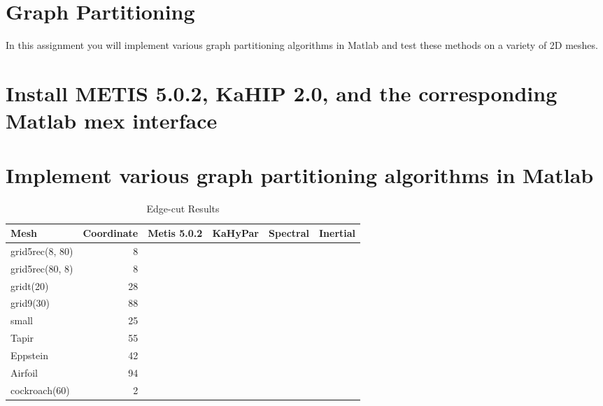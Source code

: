 \documentclass[unicode,11pt,a4paper,oneside,numbers=endperiod,openany]{scrartcl}
\begin{document}
\setassignment
{}

\newline

\section*{Graph Partitioning}
In this assignment  you will implement various graph partitioning algorithms in Matlab and test these methods on a variety of 2D meshes.



\section{Install METIS 5.0.2, KaHIP  2.0, and the corresponding Matlab mex interface }
\section{Implement various graph partitioning algorithms in Matlab }
\begin{table}[h]
	\caption{Edge-cut Results}
	\centering
	\begin{tabular}{l|r|r|r|r|r} \hline\hline 
		Mesh             &  Coordinate           & Metis 5.0.2 &  KaHyPar & Spectral & Inertial  \\ \hline
		grid5rec(8, 80)  &    8                   &            &            &          &           \\             
		grid5rec(80, 8)  &    8                   &            &           &          &           \\ 
		gridt(20)        &   28                   &            &           &          &           \\ 
		grid9(30)        &   88                   &            &           &          &           \\ 
		small            &   25                   &            &           &          &           \\
		Tapir            &   55                   &            &           &          &           \\ 
		Eppstein         &   42                   &            &           &          &           \\ 
		Airfoil          &   94                   &            &           &          &           \\ 
		cockroach(60)    &    2                   &            &           &          &           \\ \hline \hline
	\end{tabular}
	\label{table:edge}
\end{table}
\end{document}
